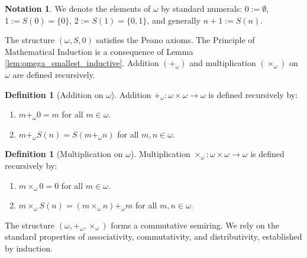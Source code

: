 \documentclass[11pt, a4paper]{article}
\theoremstyle{plain}
\theoremstyle{definition}
\newtheorem{definition}[theorem]{Definition}
\newtheorem{notation}[theorem]{Notation}
\numberwithin{equation}{section}
\begin{document}
\begin{notation}
We denote the elements of $\omega$ by standard numerals: $0 := \emptyset$, $1 := S(0) = \{0\}$, $2 := S(1) = \{0, 1\}$, and generally $n+1 := S(n)$.
\end{notation}

The structure $(\omega, S, 0)$ satisfies the Peano axioms. The Principle of Mathematical Induction is a consequence of Lemma \ref{lem:omega_smallest_inductive}. Addition $(+_\omega)$ and multiplication $(\times_\omega)$ on $\omega$ are defined recursively.

\begin{definition}[Addition on $\omega$]
Addition $+_\omega: \omega \times \omega \to \omega$ is defined recursively by:
\begin{enumerate}
    \item $m+_\omega 0 = m$ for all $m \in \omega$.
    \item $m+_\omega S(n) = S(m+_\omega n)$ for all $m, n \in \omega$.
\end{enumerate}
\end{definition}

\begin{definition}[Multiplication on $\omega$]
Multiplication $\times_\omega: \omega \times \omega \to \omega$ is defined recursively by:
\begin{enumerate}
    \item $m\times_\omega 0 = 0$ for all $m \in \omega$.
    \item $m\times_\omega S(n) = (m\times_\omega n) +_\omega m$ for all $m, n \in \omega$.
\end{enumerate}
\end{definition}

The structure $(\omega, +_\omega, \times_\omega)$ forms a commutative semiring. We rely on the standard properties of associativity, commutativity, and distributivity, established by induction.
\end{document}
